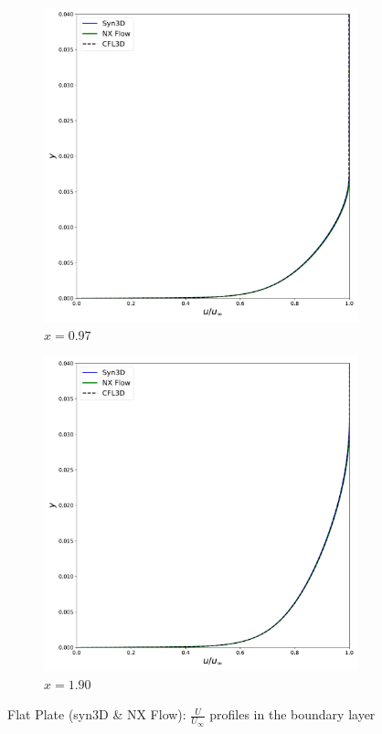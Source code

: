 \begin{figure}[ht!]
\centering
\begin{subfigure}{.45\textwidth}
  \centering
  \includegraphics[width=1.0\textwidth]{figs/flat/u097.pdf}
  \caption{$x=0.97$}
\end{subfigure}%
\begin{subfigure}{.45\textwidth}
  \centering
  \includegraphics[width=1.0\textwidth]{figs/flat/u190.pdf}
  \caption{$x=1.90$}
\end{subfigure}
\caption{Flat Plate (syn3D \& NX Flow): $\frac{U}{U_{\infty}}$ profiles in the boundary layer}
\label{fig:flatu}
\end{figure}

